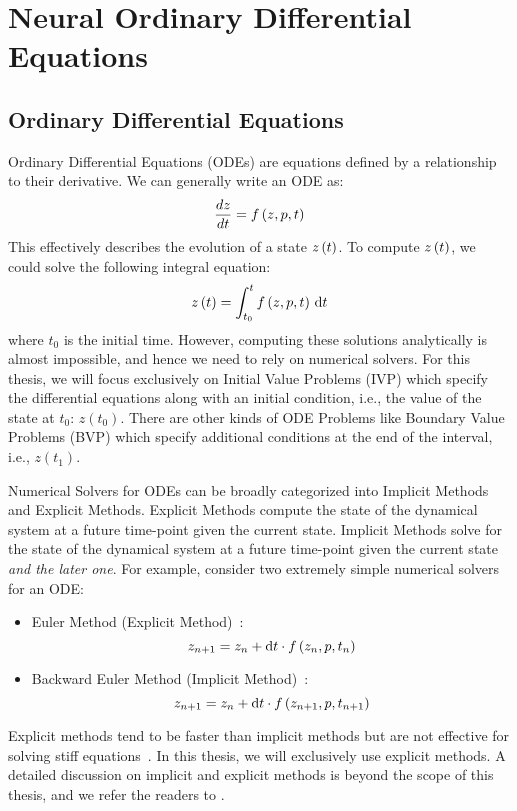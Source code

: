\chapter{Neural Ordinary Differential Equations}
\label{chapter:neural_ode}

\section{Ordinary Differential Equations}
\label{sec:ordinary_differential_equations}

Ordinary Differential Equations (ODEs) are equations defined by a relationship to their derivative. We can generally write an ODE as:
%
\begin{equation}
  \frac{dz}{dt} = f\left(z, p, t\right)
\end{equation}
%
This effectively describes the evolution of a state $z\left(t\right)$. To compute $z\left(t\right)$, we could solve the following integral equation:
%
\begin{equation}
  z\left(t\right) = \int_{t_0}^{t} f\left(z, p, t\right) \, \mathrm{d}t
\end{equation}
%
where $t_0$ is the initial time. However, computing these solutions analytically is almost impossible, and hence we need to rely on numerical solvers. For this thesis, we will focus exclusively on Initial Value Problems (IVP) which specify the differential equations along with an initial condition, i.e., the value of the state at $t_0$: $z(t_0)$. There are other kinds of ODE Problems like Boundary Value Problems (BVP) which specify additional conditions at the end of the interval, i.e., $z(t_1)$.

Numerical Solvers for ODEs can be broadly categorized into Implicit Methods and Explicit Methods. Explicit Methods compute the state of the dynamical system at a future time-point given the current state. Implicit Methods solve for the state of the dynamical system at a future time-point given the current state \textit{and the later one}. For example, consider two extremely simple numerical solvers for an ODE:
%
\begin{itemize}
  \item Euler Method (Explicit Method)~\citep{euler1824institutionum}:
        \begin{equation}
          z_{n + 1} = z_n + \mathrm{d}t \cdot f\left(z_n, p, t_n\right)
        \end{equation}
  \item Backward Euler Method (Implicit Method)~\citep{euler1824institutionum}:
        \begin{equation}
          z_{n + 1} = z_n + \mathrm{d}t \cdot f\left(z_{n + 1}, p, t_{n + 1}\right)
        \end{equation}
\end{itemize}
%
Explicit methods tend to be faster than implicit methods but are not effective for solving stiff equations~\citep{wanner1996solving,kim2021stiff}. In this thesis, we will exclusively use explicit methods. A detailed discussion on implicit and explicit methods is beyond the scope of this thesis, and we refer the readers to \citet{rackauckas2019scimlbook}.

